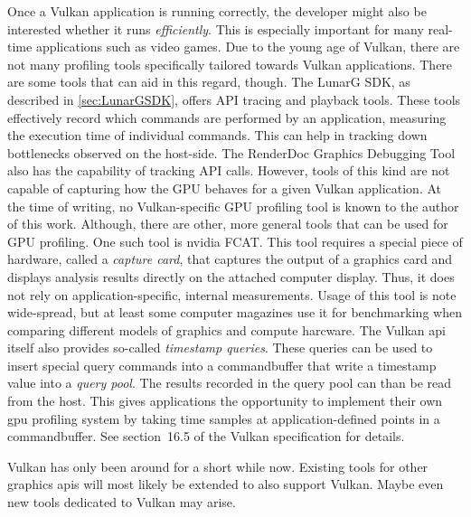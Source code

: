     Once a Vulkan application is running correctly, the developer might also be interested whether it runs \textit{efficiently}.
    This is especially important for many real-time applications such as video games.
    Due to the young age of Vulkan, there are not many profiling tools specifically tailored towards Vulkan applications.
    There are some tools that can aid in this regard, though.
    The LunarG SDK, as described in \ref{sec:LunarGSDK}, offers API tracing and playback tools.
    These tools effectively record which commands are performed by an application, measuring the execution time of individual commands.
    This can help in tracking down bottlenecks observed on the host-side.
    The RenderDoc Graphics Debugging Tool\cite{renderdoc} also has the capability of tracking API calls.
    However, tools of this kind are not capable of capturing how the GPU behaves for a given Vulkan application.
    At the time of writing, no Vulkan-specific GPU profiling tool is known to the author of this work.
    Although, there are other, more general tools that can be used for GPU profiling.
    One such tool is \gls{nvidia} FCAT\cite{nvidiafcat}.
    This tool requires a special piece of hardware, called a \textit{capture card}, that captures the output of a graphics card and displays analysis results directly on the attached computer display.
    Thus, it does not rely on application-specific, internal measurements.
    Usage of this tool is note wide-spread, but at least some computer magazines use it for benchmarking when comparing different models of graphics and compute harcware\cite{eurogamer2016:doomvulkan}.
    The Vulkan \gls{api} itself also provides so-called \textit{timestamp queries}.
    These queries can be used to insert special query commands into a commandbuffer that write a timestamp value into a \textit{query pool}.
    The results recorded in the query pool can than be read from the host.
    This gives applications the opportunity to implement their own \gls{gpu} profiling system by taking time samples at application-defined points in a commandbuffer.
    See section~16.5 of the Vulkan specification\cite{vkspec} for details.

    Vulkan has only been around for a short while now.
    Existing tools for other graphics \glspl{api} will most likely be extended to also support Vulkan.
    Maybe even new tools dedicated to Vulkan may arise.
